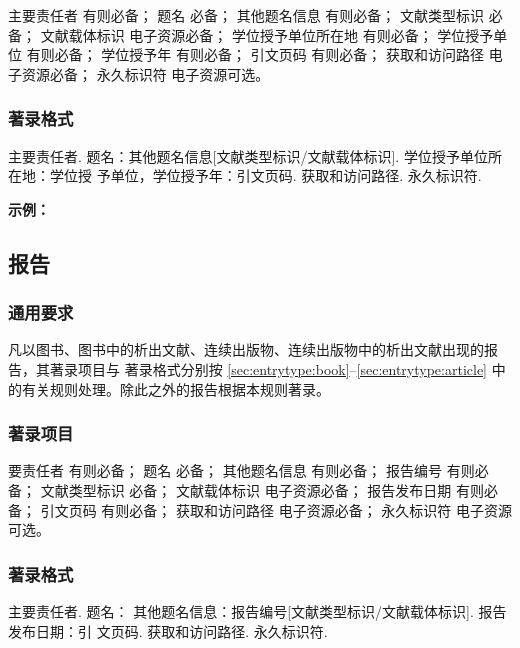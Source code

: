 \documentclass[twoside]{article}%
\begin{document}
主要责任者 有则必备；
题名 必备；
其他题名信息 有则必备；
文献类型标识 必备；
文献载体标识 电子资源必备；
学位授予单位所在地 有则必备；
学位授予单位 有则必备；
学位授予年 有则必备；
引文页码 有则必备；
获取和访问路径 电子资源必备；
永久标识符 电子资源可选。

\subsubsection{著录格式}

主要责任者. 题名：其他题名信息[文献类型标识/文献载体标识]. 学位授予单位所在地：学位授
予单位，学位授予年：引文页码. 获取和访问路径. 永久标识符.

\begin{refsection}

\nocite{王琦2022,CALMS1965--,何筱梅2016,CHRISTOU2024,曲恩熙2023社交}


\textbf{示例：}

{\printbibliography[heading=none,env=indentegenv]}
\end{refsection}


\subsection{报告}\label{sec:entrytype:report}

\subsubsection{通用要求}

凡以图书、图书中的析出文献、连续出版物、连续出版物中的析出文献出现的报告，其著录项目与
著录格式分别按 \ref{sec:entrytype:book}--\ref{sec:entrytype:article} 中的有关规则处理。除此之外的报告根据本规则著录。

\subsubsection{著录项目}

要责任者 有则必备；
题名 必备；
其他题名信息 有则必备；
报告编号 有则必备；
文献类型标识 必备；
文献载体标识 电子资源必备；
报告发布日期 有则必备；
引文页码 有则必备；
获取和访问路径 电子资源必备；
永久标识符 电子资源可选。

\subsubsection{著录格式}
主要责任者. 题名： 其他题名信息：报告编号[文献类型标识/文献载体标识]. 报告发布日期：引
文页码. 获取和访问路径. 永久标识符.
\end{document}
